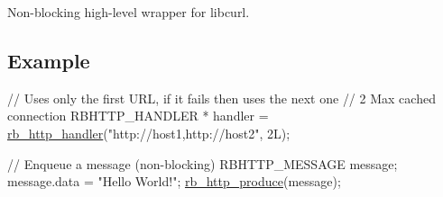 Non-\/blocking high-\/level wrapper for libcurl.

\subsection*{Example}


\begin{DoxyCode}
\textcolor{comment}{//  Uses only the first URL, if it fails then uses the next one}
\textcolor{comment}{//  2 Max cached connection}
\textcolor{comment}{}RBHTTP\_HANDLER * handler = \hyperlink{librb-http_8h_a190d674d1d8cac12e0dd2445c5c8cba4}{rb\_http\_handler}(\textcolor{stringliteral}{"http://host1,http://host2"}, 2L);

\textcolor{comment}{// Enqueue a message (non-blocking)}
\textcolor{comment}{}RBHTTP\_MESSAGE message;
message.data = \textcolor{stringliteral}{"Hello World!"};
\hyperlink{librb-http_8h_a6f4b97a63ef87f1f51176db8947ab907}{rb\_http\_produce}(message);
\end{DoxyCode}
 